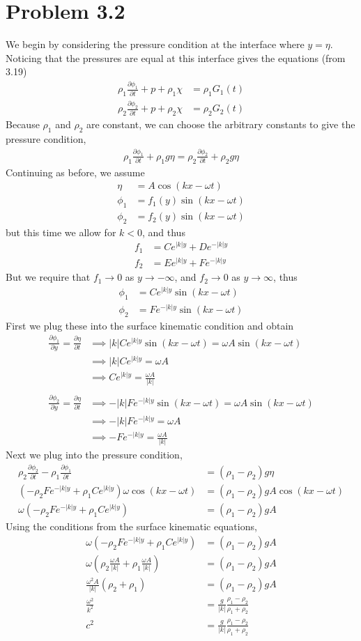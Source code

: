 \documentclass[12pt]{article}
\newcommand{\eq}[1]{\begin{align*}#1\end{align*}}
\newcommand{\p}[2]{\frac{\partial#1}{\partial#2}}
\begin{document}
\section*{Problem 3.2} We begin by considering the pressure condition at the interface where $y = \eta$. Noticing that the pressures are equal at this interface gives the equations (from 3.19)
\eq{
	\rho_1\p{\phi_1}{t} + p + \rho_1\chi &= \rho_1G_1(t)\\
	\rho_2\p{\phi_2}{t} + p + \rho_2\chi &= \rho_2G_2(t)
}
Because $\rho_1$ and $\rho_2$ are constant, we can choose the arbitrary constants to give the pressure condition,
\eq{
	\rho_1\p{\phi_1}{t} + \rho_1g\eta = \rho_2\p{\phi_2}{t} + \rho_2g\eta
}
Continuing as before, we assume
\eq{
	\eta &= A\cos(kx - \omega t)\\
	\phi_1 &= f_1(y)\sin(kx - \omega t)\\
	\phi_2 &= f_2(y)\sin(kx - \omega t)
}
but this time we allow for $k < 0$, and thus
\eq{
	f_1 &= Ce^{|k|y} + De^{-|k|y}\\
	f_2 &= Ee^{|k|y} + Fe^{-|k|y}
}
But we require that $f_1 \rightarrow 0$ as $y \rightarrow -\infty$, and $f_2 \rightarrow 0$ as $y \rightarrow \infty$, thus
\eq{
	\phi_1 &= Ce^{|k|y}\sin(kx - \omega t)\\
	\phi_2 &= Fe^{-|k|y}\sin(kx - \omega t)
}
First we plug these into the surface kinematic condition and obtain
\eq{
	\p{\phi_1}{y} = \p{\eta}{t} &\implies |k|Ce^{|k|y}\sin(kx - \omega t) = \omega A\sin(kx - \omega t)\\
	&\implies |k|Ce^{|k|y} = \omega A\\
	&\implies Ce^{|k|y} = \frac{\omega A}{|k|}\\
	\\
	\p{\phi_2}{y} = \p{\eta}{t} &\implies -|k|Fe^{-|k|y}\sin(kx - \omega t) = \omega A\sin(kx - \omega t)\\
	&\implies -|k|Fe^{-|k|y} = \omega A\\
	&\implies -Fe^{-|k|y} = \frac{\omega A}{|k|}
}
Next we plug into the pressure condition,
\eq{
	\rho_2\p{\phi_2}{t} - \rho_1\p{\phi_1}{t} &= (\rho_1 - \rho_2)g\eta\\
	(-\rho_2 Fe^{-|k|y} + \rho_1Ce^{|k|y})\omega \cos(kx - \omega t) &= (\rho_1 - \rho_2)gA\cos(kx - \omega t)\\
	\omega(-\rho_2 Fe^{-|k|y} + \rho_1Ce^{|k|y}) &= (\rho_1 - \rho_2)gA
}
Using the conditions from the surface kinematic equations,
\eq{
	\omega(-\rho_2 Fe^{-|k|y} + \rho_1Ce^{|k|y}) &= (\rho_1 - \rho_2)gA\\
	\omega(\rho_2 \frac{\omega A}{|k|} + \rho_1 \frac{\omega A}{|k|}) &= (\rho_1 - \rho_2)gA\\
	\frac{\omega^2 A}{|k|}(\rho_2 + \rho_1) &= (\rho_1 - \rho_2)gA\\
	\frac{\omega^2}{k^2} &= \frac{g}{|k|}\frac{\rho_1 - \rho_2}{\rho_1 + \rho_2}\\
	c^2 &= \frac{g}{|k|}\frac{\rho_1 - \rho_2}{\rho_1 + \rho_2}
}
\end{document}
